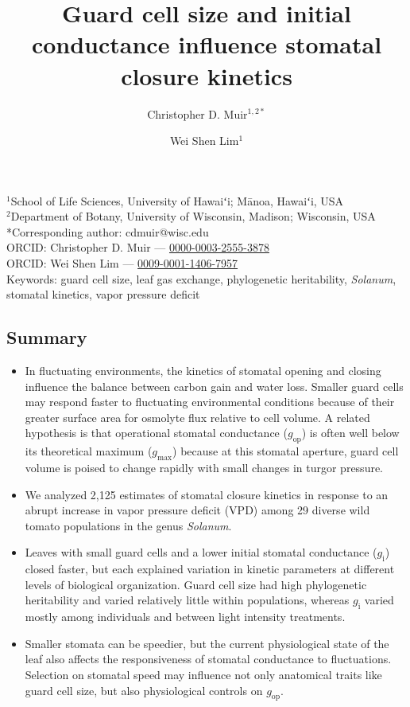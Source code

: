 \documentclass[
  letterpaper,
  DIV=11,
  numbers=noendperiod]{scrartcl}
\title{Guard cell size and initial conductance influence stomatal
closure kinetics}
\author{Christopher D. Muir\(^{1,2*}\) \and Wei Shen Lim\(^{1}\)}
\date{}
\newcommand{\gi}{$g_\mathrm{i}$}
\newcommand{\gmax}{$g_\mathrm{max}$}
\newcommand{\gop}{$g_\mathrm{op}$}
\begin{document}
\maketitle

\begin{center}
$^1$School of Life Sciences, University of Hawaiʻi; Mānoa, Hawaiʻi, USA\\
$^2$Department of Botany, University of Wisconsin, Madison; Wisconsin, USA\\
\medskip
*Corresponding author: cdmuir@wisc.edu\\
\medskip
ORCID: Christopher D. Muir — \href{https://orcid.org/0000-0003-2555-3878}{0000-0003-2555-3878}\\
ORCID: Wei Shen Lim — \href{https://orcid.org/0009-0001-1406-7957}{0009-0001-1406-7957}\\
\medskip
Keywords: guard cell size, leaf gas exchange, phylogenetic heritability, \textit{Solanum}, stomatal kinetics, vapor pressure deficit
\end{center}

\linenumbers
\onehalfspacing

\newpage{}

\subsection{Summary}\label{summary}

\begin{itemize}
\item
  In fluctuating environments, the kinetics of stomatal opening and
  closing influence the balance between carbon gain and water loss.
  Smaller guard cells may respond faster to fluctuating environmental
  conditions because of their greater surface area for osmolyte flux
  relative to cell volume. A related hypothesis is that operational
  stomatal conductance (\gop) is often well below its theoretical
  maximum (\gmax) because at this stomatal aperture, guard cell volume
  is poised to change rapidly with small changes in turgor pressure.
\item
  We analyzed 2,125 estimates of stomatal closure kinetics in response
  to an abrupt increase in vapor pressure deficit (VPD) among 29 diverse
  wild tomato populations in the genus \emph{Solanum}.
\item
  Leaves with small guard cells and a lower initial stomatal conductance
  (\gi) closed faster, but each explained variation in kinetic
  parameters at different levels of biological organization. Guard cell
  size had high phylogenetic heritability and varied relatively little
  within populations, whereas \gi{} varied mostly among individuals and
  between light intensity treatments.
\item
  Smaller stomata can be speedier, but the current physiological state
  of the leaf also affects the responsiveness of stomatal conductance to
  fluctuations. Selection on stomatal speed may influence not only
  anatomical traits like guard cell size, but also physiological
  controls on \gop.
\end{itemize}
\end{document}
